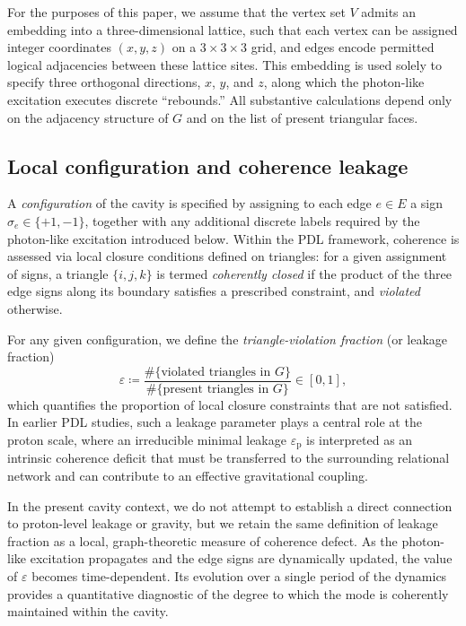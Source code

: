 \documentclass{article}
\theoremstyle{definition}
\begin{document}
For the purposes of this paper, we assume that the vertex set $V$ admits an embedding into a three-dimensional lattice, such that each vertex can be assigned integer coordinates $(x,y,z)$ on a $3\times 3\times 3$ grid, and edges encode permitted logical adjacencies between these lattice sites.\cite{Effective_Fields_PDL_2026} This embedding is used solely to specify three orthogonal directions, $x$, $y$, and $z$, along which the photon-like excitation executes discrete “rebounds.” All substantive calculations depend only on the adjacency structure of $G$ and on the list of present triangular faces.

\subsection{Local configuration and coherence leakage}

A \emph{configuration} of the cavity is specified by assigning to each edge $e \in E$ a sign $\sigma_e \in \{+1,-1\}$, together with any additional discrete labels required by the photon-like excitation introduced below.\cite{Topological_Reformulation_PDL_2026} Within the PDL framework, coherence is assessed via local closure conditions defined on triangles: for a given assignment of signs, a triangle $\{i,j,k\}$ is termed \emph{coherently closed} if the product of the three edge signs along its boundary satisfies a prescribed constraint, and \emph{violated} otherwise.\cite{Topological_Reformulation_PDL_2026,Exponent_18_PDL_2026}

For any given configuration, we define the \emph{triangle-violation fraction} (or leakage fraction)
\[
\varepsilon \coloneqq \frac{\#\{\text{violated triangles in } G\}}{\#\{\text{present triangles in } G\}} \in [0,1],
\]
which quantifies the proportion of local closure constraints that are not satisfied.\cite{Topological_Reformulation_PDL_2026} In earlier PDL studies, such a leakage parameter plays a central role at the proton scale, where an irreducible minimal leakage $\varepsilon_{\mathrm{p}}$ is interpreted as an intrinsic coherence deficit that must be transferred to the surrounding relational network and can contribute to an effective gravitational coupling.\cite{Exponent_18_PDL_2026,Effective_Fields_PDL_2026}

In the present cavity context, we do not attempt to establish a direct connection to proton-level leakage or gravity, but we retain the same definition of leakage fraction as a local, graph-theoretic measure of coherence defect. As the photon-like excitation propagates and the edge signs are dynamically updated, the value of $\varepsilon$ becomes time-dependent. Its evolution over a single period of the dynamics provides a quantitative diagnostic of the degree to which the mode is coherently maintained within the cavity.\cite{Effective_Fields_PDL_2026}
\end{document}
